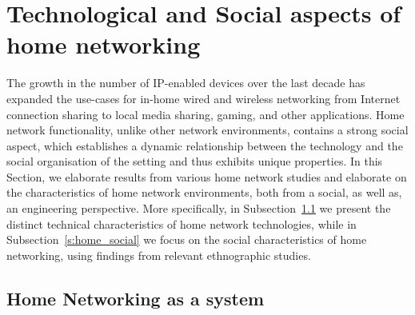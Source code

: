 \section{Technological and Social aspects of home networking} \label{s:elephant}

The growth in the number of IP-enabled devices over the last decade  has
expanded the use-cases for in-home wired and wireless networking from Internet
connection sharing to local media sharing, gaming, and other applications.  Home
network functionality, unlike other network environments, contains a strong
social aspect, which establishes a dynamic relationship between the technology
and the social organisation of the setting and thus exhibits unique properties.
In this Section, we elaborate results from various home network studies and
elaborate on the characteristics of home network environments, both from a
social, as well as, an engineering perspective.  More specifically, in
Subsection~\ref{s:home_measurement} we present the distinct technical
characteristics of home network technologies, while in
Subsection~\ref{s:home_social} we focus on the social characteristics of
home networking, using findings from relevant ethnographic studies. 



\subsection{Home Networking as a system} \label{s:home_measurement}

